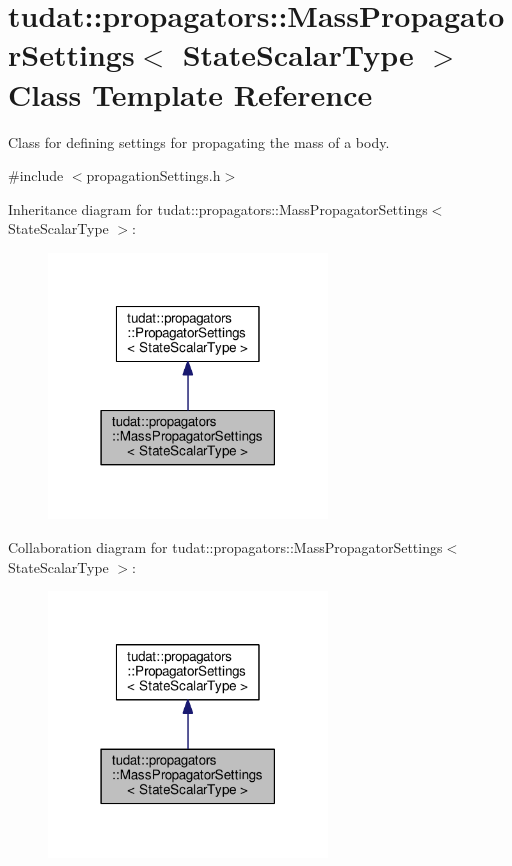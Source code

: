 \hypertarget{classtudat_1_1propagators_1_1MassPropagatorSettings}{}\section{tudat\+:\+:propagators\+:\+:Mass\+Propagator\+Settings$<$ State\+Scalar\+Type $>$ Class Template Reference}
\label{classtudat_1_1propagators_1_1MassPropagatorSettings}


Class for defining settings for propagating the mass of a body.  




{\ttfamily \#include $<$propagation\+Settings.\+h$>$}



Inheritance diagram for tudat\+:\+:propagators\+:\+:Mass\+Propagator\+Settings$<$ State\+Scalar\+Type $>$\+:
\nopagebreak
\begin{figure}[H]
\begin{center}
\leavevmode
\includegraphics[width=210pt]{classtudat_1_1propagators_1_1MassPropagatorSettings__inherit__graph}
\end{center}
\end{figure}


Collaboration diagram for tudat\+:\+:propagators\+:\+:Mass\+Propagator\+Settings$<$ State\+Scalar\+Type $>$\+:
\nopagebreak
\begin{figure}[H]
\begin{center}
\leavevmode
\includegraphics[width=210pt]{classtudat_1_1propagators_1_1MassPropagatorSettings__coll__graph}
\end{center}
\end{figure}
